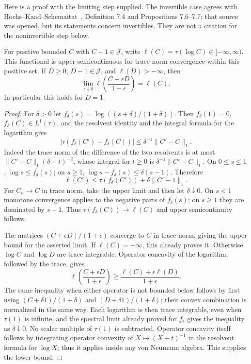 Here is a proof with the limiting step supplied. The invertible case agrees
with Hochs--Kaad--Schemaitat~\cite{HKS2018}, Definition 7.4 and Propositions
7.6--7.7; that source was opened, but its statements concern invertibles.
They are not a citation for the noninvertible step below.

\begin{lemma}
\label{geo-H-regularization}
For positive bounded $C$ with $C-1\in\mathcal J$, write
$\ell(C)=\tau(\log C)\in[-\infty,\infty)$. This functional is upper
semicontinuous for trace-norm convergence within this positive set. If
$D\geq0$, $D-1\in\mathcal J$, and $\ell(D)>-\infty$, then
\[
 \lim_{\epsilon\downarrow0}
 \ell\left(\frac{C+\epsilon D}{1+\epsilon}\right)=\ell(C).
\]
In particular this holds for $D=1$.
\end{lemma}
\begin{proof}
For $\delta>0$ let $f_\delta(s)=\log((s+\delta)/(1+\delta))$.
Then $f_\delta(1)=0$, $f_\delta(C)\in L^1(\tau)$, and the resolvent identity
and the integral formula for the logarithm give
\[
 |\tau(f_\delta(C')-f_\delta(C))|
 \leq\delta^{-1}\|C'-C\|_1.
\]
Indeed the trace norm of the difference of the two resolvents is at most
$\|C'-C\|_1(\delta+t)^{-2}$, whose integral for $t\geq0$ is
$\delta^{-1}\|C'-C\|_1$. On $0\leq s\leq1$, $\log s\leq f_\delta(s)$;
on $s\geq1$,
$\log s-f_\delta(s)\leq\delta(s-1)$. Therefore
\[
 \ell(C')\leq\tau(f_\delta(C'))+
                       \delta\|C'-1\|_1.
\]
For $C_n\to C$ in trace norm, take the upper limit and then let
$\delta\downarrow0$. On $s<1$ monotone convergence applies to the negative
parts of $f_\delta(s)$; on $s\geq1$ they are dominated by $s-1$.
Thus $\tau(f_\delta(C))\to\ell(C)$ and upper semicontinuity follows.

The matrices $(C+\epsilon D)/(1+\epsilon)$ converge to $C$ in trace norm,
giving the upper bound for the asserted limit. If $\ell(C)=-\infty$, this
already proves it. Otherwise $\log C$ and $\log D$ are trace integrable.
Operator concavity of the logarithm, followed by the trace, gives
\[
 \ell\left(\frac{C+\epsilon D}{1+\epsilon}\right)
 \geq\frac{\ell(C)+\epsilon\ell(D)}{1+\epsilon}.
\]
The same inequality when either operator is not bounded below follows by
first using $(C+\delta1)/(1+\delta)$ and
$(D+\delta1)/(1+\delta)$; their convex combination is normalized in the
same way. Each logarithm is then trace integrable, even when $\tau(1)$ is
infinite, and the spectral limit already proved for $f_\delta$ gives the
inequality as $\delta\downarrow0$. No scalar multiple of $\tau(1)$ is
subtracted. Operator concavity itself follows by integrating operator convexity
of $X\mapsto(X+t)^{-1}$ in the resolvent formula for $\log X$; thus it
applies inside any von Neumann algebra. This supplies the lower bound.
\end{proof}

